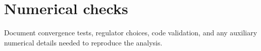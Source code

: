 \section{Numerical checks}
\label{app:numerics}

Document convergence tests, regulator choices, code validation, and any
auxiliary numerical details needed to reproduce the analysis.
